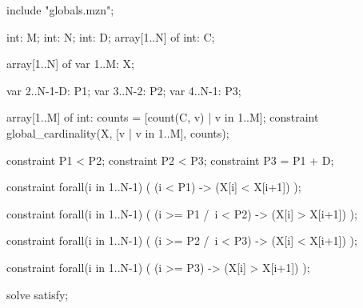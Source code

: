 \documentclass[12pt]{article}
\begin{document}
\begin{mznbox}{}
include "globals.mzn"; %
 
int: M;
int: N;
int: D;
array[1..N] of int: C;

array[1..N] of var 1..M: X;

var 2..N-1-D: P1; %
var 3..N-2: P2; %
var 4..N-1: P3; %

array[1..M] of int: counts = [count(C, v) | v in 1..M];
constraint global_cardinality(X, [v | v in 1..M], counts);


constraint P1 < P2;
constraint P2 < P3;
constraint P3 = P1 + D;

constraint forall(i in 1..N-1) (
    (i < P1) -> (X[i] < X[i+1])
);

constraint forall(i in 1..N-1) (
    (i >= P1 /\ i < P2) -> (X[i] > X[i+1])
);

constraint forall(i in 1..N-1) (
    (i >= P2 /\ i < P3) -> (X[i] < X[i+1])
);

constraint forall(i in 1..N-1) (
    (i >= P3) -> (X[i] > X[i+1])
);

solve satisfy;
\end{mznbox}
\end{document}
